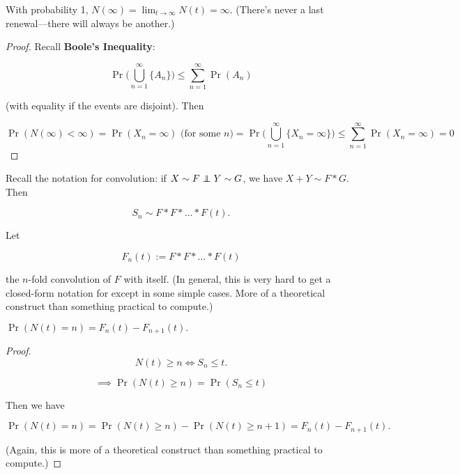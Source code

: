 \begin{proposition} With probability 1, \(N(\infty) = \lim_{t \to \infty} N(t) = \infty\). (There's never a last renewal---there will always be another.)

\end{proposition}



\begin{proof}

Recall \textbf{Boole's Inequality}:

\[
\Pr\bigg( \bigcup_{n=1}^\infty \{A_n \} \bigg) \leq \sum_{n=1}^\infty \Pr(A_n)
\]

(with equality if the events are disjoint). Then

\[
\Pr(N(\infty) < \infty) = \Pr(X_n = \infty) \text{ (for some } n) = \Pr\bigg( \bigcup_{n=1}^\infty \{X_n = \infty \} \bigg) \leq \sum_{n=1}^\infty \Pr(X_n = \infty) = 0
\]

\end{proof}

\begin{definition}Recall the notation for convolution: if \(X \sim F \indep Y \sim G\), we have \(X +Y \sim F * G\). Then

\[
S_n \sim F*F*\ldots *F(t).
\]

Let

\[
F_n(t) := F*F*\ldots *F(t)
\]

the \(n\)-fold convolution of \(F\) with itself. (In general, this is very hard to get a closed-form notation for except in some simple cases. More of a theoretical construct than something practical to compute.)
\end{definition}

\begin{proposition} \(\Pr(N(t) = n) = F_n(t) - F_{n+1}(t).\)

\end{proposition}

\begin{proof}

\[
N(t) \geq n \iff S_n \leq t.
\]

\[
\implies \Pr(N(t) \geq n) = \Pr(S_n \leq t)
\]

Then we have

\[
\Pr(N(t) = n) = \Pr(N(t) \geq n) - \Pr(N(t) \geq n+1) = F_n(t) - F_{n+1}(t).
\]

(Again, this is more of a theoretical construct than something practical to compute.)

\end{proof}

